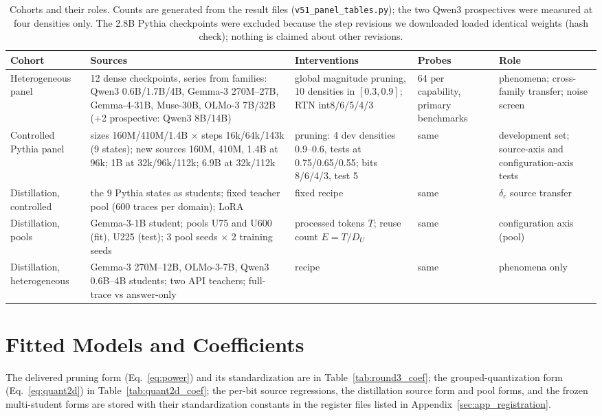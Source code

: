 \begin{table}[H]
\centering\footnotesize\setlength{\tabcolsep}{3pt}
\begin{tabular}{@{}p{2.55cm}p{3.35cm}p{2.95cm}p{1.85cm}p{2.35cm}@{}}
\toprule
Cohort & Sources & Interventions & Probes & Role \\
\midrule
Heterogeneous panel & 12 dense checkpoints, \nSeries{} series from
\nFamilies{} families: Qwen3 0.6B/1.7B/4B, Gemma-3 270M--27B,
Gemma-4-31B, Muse-30B, OLMo-3 7B/32B (+2 prospective: Qwen3 8B/14B) &
global magnitude pruning, 10 densities in $[0.3,0.9]$; RTN int8/6/5/4/3
& 64 per capability, primary benchmarks & phenomena; cross-family
transfer; noise screen \\
Controlled Pythia panel & sizes 160M/410M/1.4B $\times$ steps
16k/64k/143k (9 states); new sources 160M, 410M, 1.4B at 96k; 1B at
32k/96k/112k; 6.9B at 32k/112k & pruning: 4 dev densities 0.9--0.6,
tests at 0.75/0.65/0.55; bits 8/6/4/3, test 5 & same & development
set; source-axis and configuration-axis tests \\
Distillation, controlled & the 9 Pythia states as students; fixed
teacher pool (600 traces per domain); LoRA & fixed recipe & same &
$\delta_c$ source transfer \\
Distillation, pools & Gemma-3-1B student; pools U75 and U600 (fit),
U225 (test); 3 pool seeds $\times$ 2 training seeds & processed tokens
$T$; reuse count $E=T/D_U$ & same & configuration axis (pool) \\
Distillation, heterogeneous & Gemma-3 270M--12B, OLMo-3-7B, Qwen3
0.6B--4B students; two API teachers; full-trace vs answer-only & recipe
& same & phenomena only \\
\bottomrule
\end{tabular}
\caption{Cohorts and their roles. Counts are generated from the result
files (\texttt{v51\_panel\_tables.py}); the two Qwen3 prospectives were
measured at four densities only. The 2.8B Pythia checkpoints were
excluded because the step revisions we downloaded loaded identical
weights (hash check); nothing is claimed about other revisions.}
\label{tab:panels_full}
\end{table}


\section{Fitted Models and Coefficients}
\label{sec:app_coef}
The delivered pruning form (Eq.~\eqref{eq:power}) and its standardization are in Table~\ref{tab:round3_coef}; the
grouped-quantization form (Eq.~\eqref{eq:quant2d}) in Table~\ref{tab:quant2d_coef}; the per-bit source regressions,
the distillation source form and pool forms, and the frozen multi-student forms are stored with their standardization
constants in the register files listed in Appendix~\ref{sec:app_registration}.


\FloatBarrier

